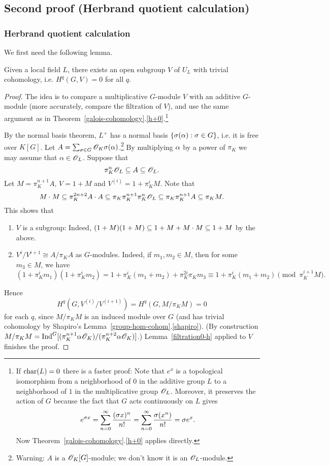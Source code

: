 \subsection{Second proof (Herbrand quotient calculation)}
\subsubsection{Herbrand quotient calculation}
We first need the following lemma.
\begin{lem}
Given a local field $L$, there exists an open subgroup $V$ of $U_L$ with trivial cohomology, i.e. $H^q(G,V)=0$ for all $q$.
\end{lem}
\begin{proof}
The idea is to compare a multiplicative $G$-module $V$ with an additive $G$-module (more accurately, compare the filtration of $V$), and use the same argument as in Theorem~\ref{galois-cohomology}.\ref{h+0}.\footnote{If $\operatorname{char}(L)=0$ there is a faster proof: Note that $e^x$ is a topological isomorphism from a neighborhood of $0$ in the additive group $L$ to a neighborhood of $1$ in the multiplicative group $\mathscr{O}_L$. Moreover, it preserves the action of $G$ because the fact that $G$ acts continuously on $L$ gives
\[
e^{\sigma x}=\sum_{n=0}^{\infty} \frac{(\sigma x)^n}{n!} =\sum_{n=0}^{\infty} \frac{\sigma (x^n)}{n!}=\sigma e^x.
\]
Now Theorem~\ref{galois-cohomology}.\ref{h+0} applies directly.}

By the normal basis theorem, $L^+$ has a normal basis $\left\{{\sigma(\alpha)}:{\sigma\in G}\right\}$, i.e. it is free over $K[G]$. Let $A=\sum_{\sigma\in G} \mathscr{O}_K\sigma(\alpha)$.\footnote{Warning: $A$ is a $\mathscr{O}_K[G]$-module; we don't know it is an $\mathscr{O}_L$-module.}
By multiplying $\alpha$ by a power of $\pi_K$ we may assume that $\alpha\in \mathscr{O}_L$. %
Suppose that
\[
\pi_K^n\mathscr{O}_L\subseteq A\subseteq \mathscr{O}_L.
\]
Let $M=\pi_K^{n+1}A$,  $V=1+M$ and $V^{(i)}=1+\pi_K^{i} M$.
Note that
\[
M\cdot M\subseteq \pi_K^{2n+2}A\cdot A\subseteq \pi_K\pi_K^{n+1}\pi_K^n\mathscr{O}_L\subseteq
\pi_K\pi_K^{n+1}A\subseteq
\pi_KM.
\]
This shows that
\begin{enumerate}
\item
$V$ is a subgroup: Indeed, $(1+M)(1+M)\subseteq 1+M+M\cdot M\subseteq 1+M$ by the above.
\item
$V^{i}/V^{i+1}\cong A/\pi_K A$ as $G$-modules. Indeed, if $m_1,m_2\in M$, then for some $m_3\in M$, we have
\[
(1+\pi_K^im_1)(1+\pi_K^im_2)= 1+\pi_K^i(m_1+m_2)+\pi_K^{2i} \pi_Km_3
\equiv 1+\pi_K^i(m_1+m_2)\pmod{\pi_K^{i+1}M}.
\]
\end{enumerate}
Hence
\[
H^q(G, V^{(i)}/V^{(i+1)})=H^q(G,M/\pi_KM)=0
\]
for each $q$, since $M/\pi_K M$ is an induced module over $G$ (and has trivial cohomology by Shapiro's Lemma~\ref{group-hom-cohom}.\ref{shapiro}). (By construction $M/\pi_K M=\operatorname{Ind}^G[(\pi_K^{n+1}\alpha\mathscr{O}_K)/(\pi_K^{n+2}\alpha\mathscr{O}_K)]$.) Lemma~\ref{filtration0-h} applied to $V$ finishes the proof.
\end{proof}
